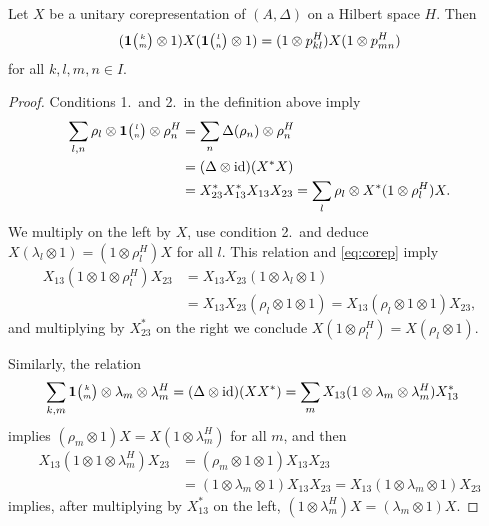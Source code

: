 \begin{Lem} \label{lem:corep-intertwine}
 Let $X$ be a unitary corepresentation of $(A,\Delta)$ on a Hilbert space $H$. Then  
    \begin{align*}
      (\mathbf{1}{\tiny {\begin{pmatrix} k\\m\end{pmatrix}}} \otimes 1)X(\mathbf{1}{\tiny {\begin{pmatrix} l\\n\end{pmatrix}}} \otimes 1) = (1 \otimes p^{H}_{kl})X(1 \otimes
      p^{H}_{mn})
    \end{align*}
   for all $k,l,m,n \in I$.
\end{Lem}
\begin{proof}
 Conditions 1.\ and 2.\ in the definition above imply
  \begin{align*}
 \sum_{l,n} \rho_{l} \otimes
  \mathbf{1}{\tiny {\begin{pmatrix} l\\n\end{pmatrix}}} \otimes \rho_{n}^{H} &=
    \sum_{n} \Delta(\rho_{n}) \otimes \rho_{n}^{H} \\ &= (\Delta \otimes
    \operatorname{id})(X^{*}X) \\ &= X^{*}_{23}X^{*}_{13}X_{13}X_{23}  =
    \sum_{l}\rho_{l} \otimes X^{*}(1 \otimes \rho_{l}^{H})X.
  \end{align*}
  We multiply on the left by $X$, use  condition 2.\ and deduce
  $X(\lambda_{l}\otimes 1)=(1\otimes \rho_{l}^{H})X$ for all $l$.
  This relation and \eqref{eq:corep} imply
 \begin{align*}
   X_{13}(1\otimes 1 \otimes \rho_{l}^{H})X_{23} &=X_{13}X_{23}(1
   \otimes \lambda_{l} \otimes 1) \\ &= X_{13}X_{23}(\rho_{l} \otimes 1
   \otimes 1) = X_{13} (\rho_{l} \otimes 1
   \otimes 1) X_{23},
 \end{align*}
 and multiplying by $X_{23}^{*}$ on the right we conclude $X(1\otimes
 \rho^{H}_{l})=X(\rho_{l} \otimes 1)$.


  Similarly,  the relation
  \begin{align*}
    \sum_{k,m} \mathbf{1}{\tiny {\begin{pmatrix} k\\m\end{pmatrix}}} \otimes \lambda_{m} \otimes
    \lambda_{m}^{H} &= (\Delta \otimes \operatorname{id})(XX^{*}) = \sum_{m}
    X_{13}(1 \otimes \lambda_{m} \otimes \lambda_{m}^{H})X_{13}^{*}
  \end{align*}
  implies $(\rho_{m} \otimes 1)X=X(1\otimes \lambda^{H}_{m})$ for all
  $m$, and then
  \begin{align*}
    X_{13}(1 \otimes 1 \otimes \lambda^{H}_{m})X_{23} &= (
    \rho_{m} \otimes 1 \otimes 1)X_{13}X_{23} \\ &= (1\otimes
    \lambda_{m}\otimes 1)X_{13}X_{23} = X_{13}(1 \otimes \lambda_{m}
    \otimes 1)X_{23}
  \end{align*}
  implies, after multiplying by $X_{13}^{*}$ on the left, $(1 \otimes
  \lambda_{m}^{H})X=(\lambda_{m} \otimes 1)X$.
\end{proof}

